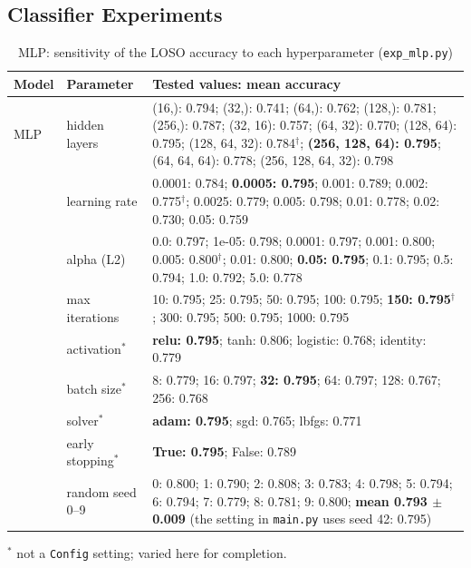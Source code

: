 \FloatBarrier
\subsection{Classifier Experiments}
\begin{table}[H]
    \centering
    \caption{MLP: sensitivity of the LOSO accuracy to each hyperparameter (\texttt{exp\_mlp.py})}
    \label{tab:sens_mlp}
    \small
    \begin{tabularx}{\textwidth}{@{} l l X @{}}
        \toprule
        \textbf{Model} & \textbf{Parameter} & \textbf{Tested values: mean accuracy} \\
        \midrule
        MLP & hidden layers & (16,): 0.794; (32,): 0.741; (64,): 0.762; (128,): 0.781; (256,): 0.787; (32, 16): 0.757; (64, 32): 0.770; (128, 64): 0.795; (128, 64, 32): 0.784$^{\dagger}$; \textbf{(256, 128, 64): 0.795}; (64, 64, 64): 0.778; (256, 128, 64, 32): 0.798 \\
         & learning rate & 0.0001: 0.784; \textbf{0.0005: 0.795}; 0.001: 0.789; 0.002: 0.775$^{\dagger}$; 0.0025: 0.779; 0.005: 0.798; 0.01: 0.778; 0.02: 0.730; 0.05: 0.759 \\
         & alpha (L2) & 0.0: 0.797; 1e-05: 0.798; 0.0001: 0.797; 0.001: 0.800; 0.005: 0.800$^{\dagger}$; 0.01: 0.800; \textbf{0.05: 0.795}; 0.1: 0.795; 0.5: 0.794; 1.0: 0.792; 5.0: 0.778 \\
         & max iterations & 10: 0.795; 25: 0.795; 50: 0.795; 100: 0.795; \textbf{150: 0.795$^{\dagger}$}; 300: 0.795; 500: 0.795; 1000: 0.795 \\
        \midrule
         & activation$^{*}$ & \textbf{relu: 0.795}; tanh: 0.806; logistic: 0.768; identity: 0.779 \\
         & batch size$^{*}$ & 8: 0.779; 16: 0.797; \textbf{32: 0.795}; 64: 0.797; 128: 0.767; 256: 0.768 \\
         & solver$^{*}$ & \textbf{adam: 0.795}; sgd: 0.765; lbfgs: 0.771 \\
         & early stopping$^{*}$ & \textbf{True: 0.795}; False: 0.789 \\
        \midrule
        & random seed 0--9 & 0: 0.800; 1: 0.790; 2: 0.808; 3: 0.783; 4: 0.798; 5: 0.794; 6: 0.794; 7: 0.779; 8: 0.781; 9: 0.800; \textbf{mean 0.793 $\pm$ 0.009} (the setting in \texttt{main.py} uses seed 42: 0.795) \\
        \bottomrule
    \end{tabularx}
    \par\smallskip\footnotesize $^{*}$ not a \texttt{Config} setting; varied here for completion.
\end{table}

